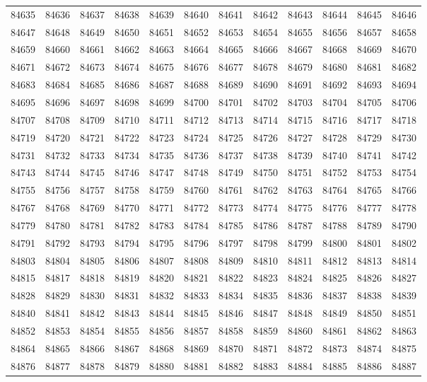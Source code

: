 \begin{center}
\begin{longtable}{llllllllllll}
84635 &84636 &84637 &84638 &84639 &84640 &84641 &84642 &84643 &84644 &84645 &84646 \\
84647 &84648 &84649 &84650 &84651 &84652 &84653 &84654 &84655 &84656 &84657 &84658 \\
84659 &84660 &84661 &84662 &84663 &84664 &84665 &84666 &84667 &84668 &84669 &84670 \\
84671 &84672 &84673 &84674 &84675 &84676 &84677 &84678 &84679 &84680 &84681 &84682 \\
84683 &84684 &84685 &84686 &84687 &84688 &84689 &84690 &84691 &84692 &84693 &84694 \\
84695 &84696 &84697 &84698 &84699 &84700 &84701 &84702 &84703 &84704 &84705 &84706 \\
84707 &84708 &84709 &84710 &84711 &84712 &84713 &84714 &84715 &84716 &84717 &84718 \\
84719 &84720 &84721 &84722 &84723 &84724 &84725 &84726 &84727 &84728 &84729 &84730 \\
84731 &84732 &84733 &84734 &84735 &84736 &84737 &84738 &84739 &84740 &84741 &84742 \\
84743 &84744 &84745 &84746 &84747 &84748 &84749 &84750 &84751 &84752 &84753 &84754 \\
84755 &84756 &84757 &84758 &84759 &84760 &84761 &84762 &84763 &84764 &84765 &84766 \\
84767 &84768 &84769 &84770 &84771 &84772 &84773 &84774 &84775 &84776 &84777 &84778 \\
84779 &84780 &84781 &84782 &84783 &84784 &84785 &84786 &84787 &84788 &84789 &84790 \\
84791 &84792 &84793 &84794 &84795 &84796 &84797 &84798 &84799 &84800 &84801 &84802 \\
84803 &84804 &84805 &84806 &84807 &84808 &84809 &84810 &84811 &84812 &84813 &84814 \\
84815 &84817 &84818 &84819 &84820 &84821 &84822 &84823 &84824 &84825 &84826 &84827 \\
84828 &84829 &84830 &84831 &84832 &84833 &84834 &84835 &84836 &84837 &84838 &84839 \\
84840 &84841 &84842 &84843 &84844 &84845 &84846 &84847 &84848 &84849 &84850 &84851 \\
84852 &84853 &84854 &84855 &84856 &84857 &84858 &84859 &84860 &84861 &84862 &84863 \\
84864 &84865 &84866 &84867 &84868 &84869 &84870 &84871 &84872 &84873 &84874 &84875 \\
84876 &84877 &84878 &84879 &84880 &84881 &84882 &84883 &84884 &84885 &84886 &84887 \\

\end{longtable}
\end{center}
